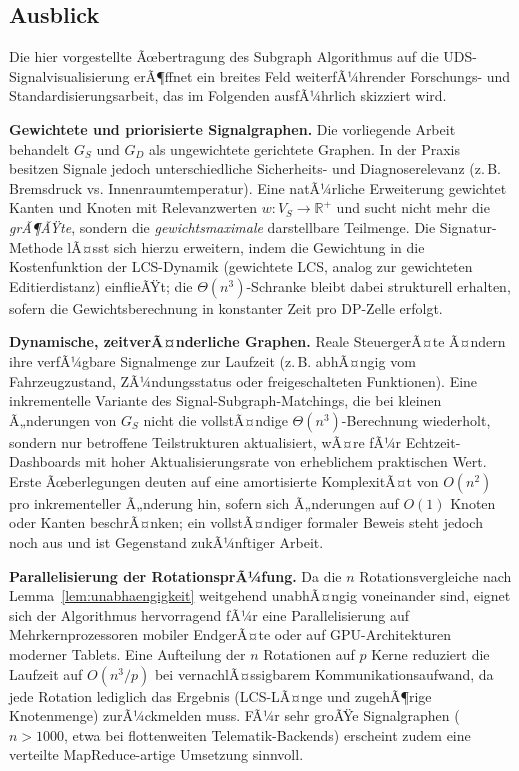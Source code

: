 ﻿\documentclass[a4paper,12pt]{article}
\theoremstyle{definition}
\begin{document}
\subsection{Ausblick}

Die hier vorgestellte Ãœbertragung des Subgraph Algorithmus auf die UDS-Signalvisualisierung erÃ¶ffnet ein breites Feld weiterfÃ¼hrender Forschungs- und Standardisierungsarbeit, das im Folgenden ausfÃ¼hrlich skizziert wird.

\textbf{Gewichtete und priorisierte Signalgraphen.} Die vorliegende Arbeit behandelt $G_S$ und $G_D$ als ungewichtete gerichtete Graphen. In der Praxis besitzen Signale jedoch unterschiedliche Sicherheits- und Diagnoserelevanz (z.\,B. Bremsdruck vs. Innenraumtemperatur). Eine natÃ¼rliche Erweiterung gewichtet Kanten und Knoten mit Relevanzwerten $w: V_S \to \mathbb{R}^+$ und sucht nicht mehr die \emph{grÃ¶ÃŸte}, sondern die \emph{gewichtsmaximale} darstellbare Teilmenge. Die Signatur-Methode lÃ¤sst sich hierzu erweitern, indem die Gewichtung in die Kostenfunktion der LCS-Dynamik (gewichtete LCS, analog zur gewichteten Editierdistanz) einflieÃŸt; die $\Theta(n^3)$-Schranke bleibt dabei strukturell erhalten, sofern die Gewichtsberechnung in konstanter Zeit pro DP-Zelle erfolgt.

\textbf{Dynamische, zeitverÃ¤nderliche Graphen.} Reale SteuergerÃ¤te Ã¤ndern ihre verfÃ¼gbare Signalmenge zur Laufzeit (z.\,B. abhÃ¤ngig vom Fahrzeugzustand, ZÃ¼ndungsstatus oder freigeschalteten Funktionen). Eine inkrementelle Variante des Signal-Subgraph-Matchings, die bei kleinen Ã„nderungen von $G_S$ nicht die vollstÃ¤ndige $\Theta(n^3)$-Berechnung wiederholt, sondern nur betroffene Teilstrukturen aktualisiert, wÃ¤re fÃ¼r Echtzeit-Dashboards mit hoher Aktualisierungsrate von erheblichem praktischen Wert. Erste Ãœberlegungen deuten auf eine amortisierte KomplexitÃ¤t von $O(n^2)$ pro inkrementeller Ã„nderung hin, sofern sich Ã„nderungen auf $O(1)$ Knoten oder Kanten beschrÃ¤nken; ein vollstÃ¤ndiger formaler Beweis steht jedoch noch aus und ist Gegenstand zukÃ¼nftiger Arbeit.

\textbf{Parallelisierung der RotationsprÃ¼fung.} Da die $n$ Rotationsvergleiche nach Lemma~\ref{lem:unabhaengigkeit} weitgehend unabhÃ¤ngig voneinander sind, eignet sich der Algorithmus hervorragend fÃ¼r eine Parallelisierung auf Mehrkernprozessoren mobiler EndgerÃ¤te oder auf GPU-Architekturen moderner Tablets. Eine Aufteilung der $n$ Rotationen auf $p$ Kerne reduziert die Laufzeit auf $O(n^3/p)$ bei vernachlÃ¤ssigbarem Kommunikationsaufwand, da jede Rotation lediglich das Ergebnis (LCS-LÃ¤nge und zugehÃ¶rige Knotenmenge) zurÃ¼ckmelden muss. FÃ¼r sehr groÃŸe Signalgraphen ($n > 1000$, etwa bei flottenweiten Telematik-Backends) erscheint zudem eine verteilte MapReduce-artige Umsetzung sinnvoll.
\end{document}
